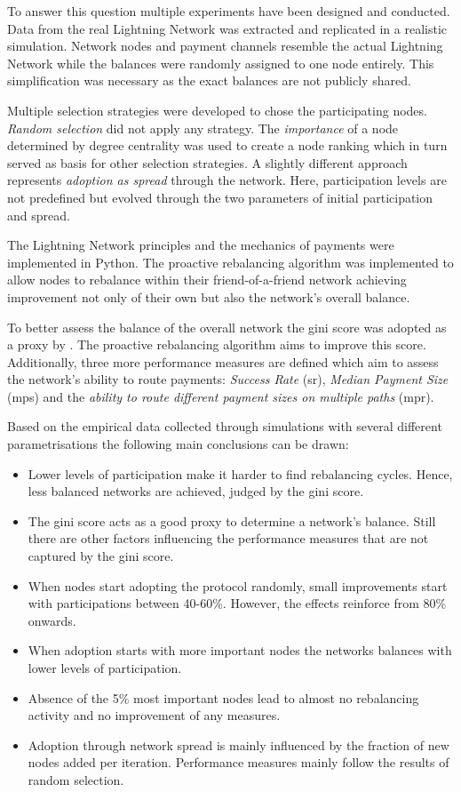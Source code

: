 \documentclass[final]{fhnwreport}       %
\begin{document}
To answer this question multiple experiments have been designed and conducted. Data from the real Lightning Network was extracted and replicated in a realistic simulation. Network nodes and payment channels resemble the actual Lightning Network while the balances were randomly assigned to one node entirely. This simplification was necessary as the exact balances are not publicly shared.

Multiple selection strategies were developed to chose the participating nodes. \emph{Random selection} did not apply any strategy. The \emph{importance} of a node determined by degree centrality was used to create a node ranking which in turn served as basis for other selection strategies. A slightly different approach represents \emph{adoption as spread} through the network. Here, participation levels are not predefined but evolved through the two parameters of initial participation and spread.

The Lightning Network principles and the mechanics of payments were implemented in Python. The proactive rebalancing algorithm was implemented to allow nodes to rebalance within their friend-of-a-friend network achieving improvement not only of their own but also the network's overall balance. 

To better assess the balance of the overall network the \gls{gini} score was adopted as a \gls{proxy} by \textcite{pickhardt_imbalance_2019}. The proactive rebalancing algorithm aims to improve this score. Additionally, three more performance measures are defined which aim to assess the network's ability to route payments: \emph{Success Rate} (\gls{sr}), \emph{Median Payment Size} (\gls{mps}) and the \emph{ability to route different payment sizes on multiple paths} (\gls{mpr}). 

Based on the empirical data collected through simulations with several different parametrisations the following main conclusions can be drawn:

\begin{itemize}
  \item Lower levels of participation make it harder to find rebalancing cycles. Hence, less balanced networks are achieved, judged by the \gls{gini} score.
  \item The \gls{gini} score acts as a good \gls{proxy} to determine a network's balance. Still there are other factors influencing the performance measures that are not captured by the \gls{gini} score.
  \item When nodes start adopting the protocol randomly, small improvements start with participations between 40-60\%. However, the effects reinforce from 80\% onwards.
  \item When adoption starts with more important nodes the networks balances with lower levels of participation.
  \item Absence of the 5\% most important nodes lead to almost no rebalancing activity and no improvement of any measures. 
  \item Adoption through network spread is mainly influenced by the fraction of new nodes added per iteration. Performance measures mainly follow the results of random selection.
\end{itemize}
\end{document}
